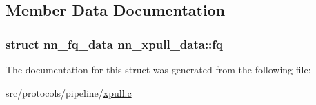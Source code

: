\subsection{Member Data Documentation}
\subsubsection[{fq}]{\setlength{\rightskip}{0pt plus 5cm}struct {\bf nn\+\_\+fq\+\_\+data} nn\+\_\+xpull\+\_\+data\+::fq}\hypertarget{structnn__xpull__data_ab7f05878a08a8ee56cd825ffc583d295}{}\label{structnn__xpull__data_ab7f05878a08a8ee56cd825ffc583d295}


The documentation for this struct was generated from the following file\+:\begin{DoxyCompactItemize}
\item 
src/protocols/pipeline/\hyperlink{xpull_8c}{xpull.\+c}\end{DoxyCompactItemize}
